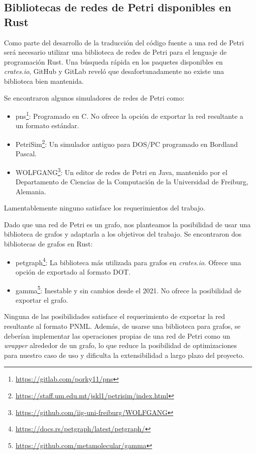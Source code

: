 \documentclass[12pt]{article}
\begin{document}
\subsection{Bibliotecas de redes de Petri disponibles en Rust}
\label{petri-net-libs}

Como parte del desarrollo de la traducción del código fuente a una red de Petri será necesario utilizar una biblioteca de redes de Petri para el lenguaje de programación Rust.
Una búsqueda rápida en los paquetes disponibles en \textit{crates.io}, GitHub y GitLab reveló que desafortunadamente no existe una biblioteca bien mantenida.

Se encontraron algunos simuladores de redes de Petri como:
\begin{itemize}
    \item pns\footnote{\url{https://gitlab.com/porky11/pns}}: Programado en C. No ofrece la opción de exportar la red resultante a un formato estándar.
    \item PetriSim\footnote{\url{https://staff.um.edu.mt/jskl1/petrisim/index.html}}: Un simulador antiguo para DOS/PC programado en Bordland Pascal.
    \item WOLFGANG\footnote{\url{https://github.com/iig-uni-freiburg/WOLFGANG}}: Un editor de redes de Petri en Java,
          mantenido por el Departamento de Ciencias de la Computación de la Universidad de Freiburg, Alemania.
\end{itemize}
Lamentablemente ninguno satisface los requerimientos del trabajo.

Dado que una red de Petri es un grafo, nos planteamos la posibilidad de usar una biblioteca de grafos y adaptarla a los objetivos del trabajo.
Se encontraron dos bibliotecas de grafos en Rust:
\begin{itemize}
    \item petgraph\footnote{\url{https://docs.rs/petgraph/latest/petgraph/}}: La biblioteca más utilizada para grafos en \textit{crates.io}. Ofrece una opción de exportado al formato DOT.
    \item gamma\footnote{\url{https://github.com/metamolecular/gamma}}: Inestable y sin cambios desde el 2021. No ofrece la posibilidad de exportar el grafo.
\end{itemize}

Ninguna de las posibilidades satisface el requerimiento de exportar la red resultante al formato PNML.
Además, de usarse una biblioteca para grafos, se deberían implementar las operaciones propias de una red de Petri como un \textit{wrapper} alrededor de un grafo,
lo que reduce la posibilidad de optimizaciones para nuestro caso de uso y dificulta la extensibilidad a largo plazo del proyecto.
\end{document}
